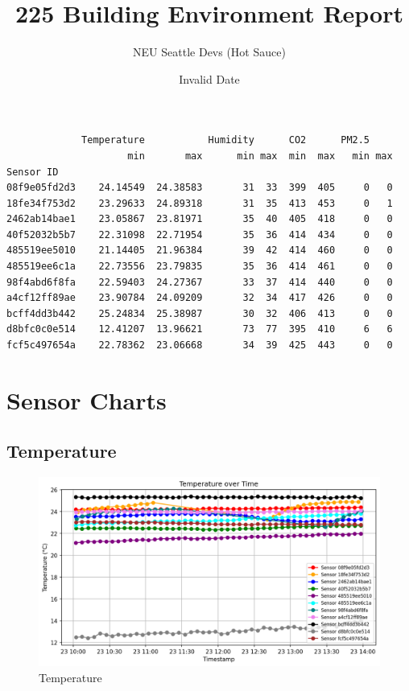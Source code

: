\documentclass[
  12pt,
  letterpaper,
]{article}
\title{225 Building Environment Report}
\author{NEU Seattle Devs (Hot Sauce)}
\date{Invalid Date}
\renewcommand*\contentsname{Table of contents}
\newcommand\contentsname{Table of contents}
\begin{document}
\maketitle

\renewcommand*\contentsname{Table of contents}
{
\hypersetup{linkcolor=}
\setcounter{tocdepth}{3}
\tableofcontents
}

\begin{verbatim}
             Temperature           Humidity      CO2      PM2.5    
                     min       max      min max  min  max   min max
Sensor ID                                                          
08f9e05fd2d3    24.14549  24.38583       31  33  399  405     0   0
18fe34f753d2    23.29633  24.89318       31  35  413  453     0   1
2462ab14bae1    23.05867  23.81971       35  40  405  418     0   0
40f52032b5b7    22.31098  22.71954       35  36  414  434     0   0
485519ee5010    21.14405  21.96384       39  42  414  460     0   0
485519ee6c1a    22.73556  23.79835       35  36  414  461     0   0
98f4abd6f8fa    22.59403  24.27367       33  37  414  440     0   0
a4cf12ff89ae    23.90784  24.09209       32  34  417  426     0   0
bcff4dd3b442    25.24834  25.38987       30  32  406  413     0   0
d8bfc0c0e514    12.41207  13.96621       73  77  395  410     6   6
fcf5c497654a    22.78362  23.06668       34  39  425  443     0   0
\end{verbatim}

\section{Sensor Charts}\label{sensor-charts}

\subsection{Temperature}\label{temperature}

\begin{figure}[H]

{\centering \includegraphics[width=0.85\linewidth,height=\textheight,keepaspectratio]{./charts/temperature_chart.png}

}

\caption{Temperature}

\end{figure}%
\end{document}
